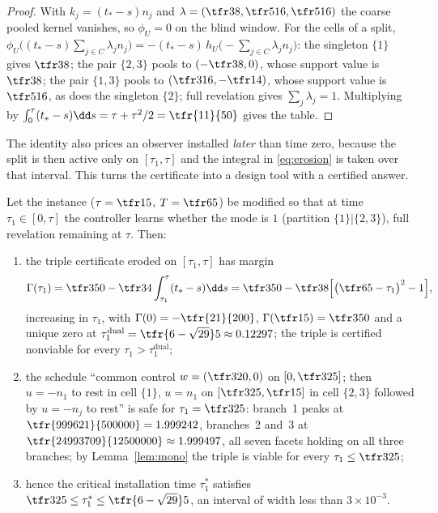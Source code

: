 \begin{proof}
With $k_j=(t_\ast-s)n_j$ and $\lambda=(\tfr38,\tfr5{16},\tfr5{16})$ the coarse pooled kernel vanishes, so $\phi_U=0$ on the blind window. For the cells of a split, $\phi_U\bigl((t_\ast-s)\sum_{j\in C}\lambda_jn_j\bigr)=-(t_\ast-s)\,h_U\bigl(-\sum_{j\in C}\lambda_jn_j\bigr)$: the singleton $\{1\}$ gives $\tfr38$; the pair $\{2,3\}$ pools to $(-\tfr38,0)$, whose support value is $\tfr38$; the pair $\{1,3\}$ pools to $(\tfr3{16},-\tfr14)$, whose support value is $\tfr5{16}$, as does the singleton $\{2\}$; full revelation gives $\sum_j\lambda_j=1$. Multiplying by $\int_0^\tau(t_\ast-s)\dd s=\tau+\tau^2/2=\tfr{11}{50}$ gives the table.
\end{proof}

The identity also prices an observer installed \emph{later} than time zero, because the split is then active only on $[\tau_1,\tau]$ and the integral in \eqref{eq:erosion} is taken over that interval. This turns the certificate into a design tool with a certified answer.

\begin{proposition}\label{prop:observer}
Let the instance ($\tau=\tfr15$, $T=\tfr65$) be modified so that at time $\tau_1\in[0,\tau]$ the controller learns whether the mode is $1$ (partition $\{1\}|\{2,3\}$), full revelation remaining at $\tau$. Then:
\begin{enumerate}[label=\textup{(\alph*)},leftmargin=2.2em,itemsep=1pt]
\item the triple certificate eroded on $[\tau_1,\tau]$ has margin
\[
\Gamma(\tau_1)=\tfr3{50}-\tfr34\int_{\tau_1}^{\tau}(t_\ast-s)\dd s=\tfr3{50}-\tfr38\Bigl[\bigl(\tfr65-\tau_1\bigr)^2-1\Bigr],
\]
increasing in $\tau_1$, with $\Gamma(0)=-\tfr{21}{200}$, $\Gamma(\tfr15)=\tfr3{50}$ and a unique zero at $\tau_1^{\mathrm{dual}}=\tfr{6-\sqrt{29}}5\approx0.12297$; the triple is certified nonviable for every $\tau_1>\tau_1^{\mathrm{dual}}$;
\item the schedule ``common control $w=(\tfr3{20},0)$ on $[0,\tfr3{25}]$; then $u=-n_1$ to rest in cell $\{1\}$, $u=n_1$ on $[\tfr3{25},\tfr15]$ in cell $\{2,3\}$ followed by $u=-n_j$ to rest'' is safe for $\tau_1=\tfr3{25}$: branch~1 peaks at $\tfr{999621}{500000}=1.999242$, branches~2 and~3 at $\tfr{24993709}{12500000}\approx1.999497$, all seven facets holding on all three branches; by Lemma~\ref{lem:mono} the triple is viable for every $\tau_1\le\tfr3{25}$;
\item hence the critical installation time $\tau_1^\ast$ satisfies $\tfr3{25}\le\tau_1^\ast\le\tfr{6-\sqrt{29}}5$, an interval of width less than $3\times10^{-3}$.
\end{enumerate}
\end{proposition}

